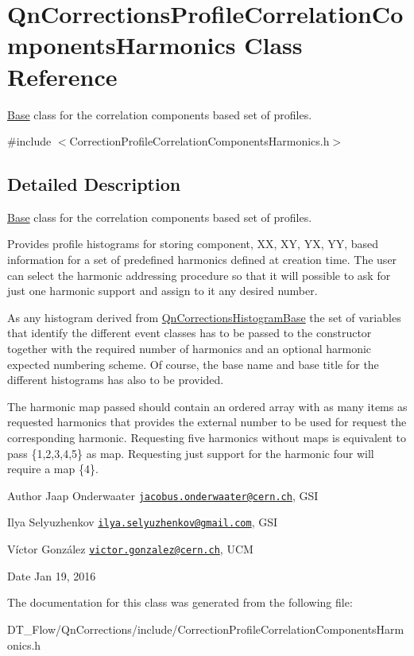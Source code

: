 \hypertarget{classQnCorrectionsProfileCorrelationComponentsHarmonics}{}\section{Qn\+Corrections\+Profile\+Correlation\+Components\+Harmonics Class Reference}
\label{classQnCorrectionsProfileCorrelationComponentsHarmonics}


\mbox{\hyperlink{classBase}{Base}} class for the correlation components based set of profiles.  




{\ttfamily \#include $<$Correction\+Profile\+Correlation\+Components\+Harmonics.\+h$>$}



\subsection{Detailed Description}
\mbox{\hyperlink{classBase}{Base}} class for the correlation components based set of profiles. 

Provides profile histograms for storing component, XX, XY, YX, YY, based information for a set of predefined harmonics defined at creation time. The user can select the harmonic addressing procedure so that it will possible to ask for just one harmonic support and assign to it any desired number.

As any histogram derived from \mbox{\hyperlink{classQnCorrectionsHistogramBase}{Qn\+Corrections\+Histogram\+Base}} the set of variables that identify the different event classes has to be passed to the constructor together with the required number of harmonics and an optional harmonic expected numbering scheme. Of course, the base name and base title for the different histograms has also to be provided.

The harmonic map passed should contain an ordered array with as many items as requested harmonics that provides the external number to be used for request the corresponding harmonic. Requesting five harmonics without maps is equivalent to pass \{1,2,3,4,5\} as map. Requesting just support for the harmonic four will require a map \{4\}.

\begin{DoxyAuthor}{Author}
Jaap Onderwaater \href{mailto:jacobus.onderwaater@cern.ch}{\tt jacobus.\+onderwaater@cern.\+ch}, G\+SI 

Ilya Selyuzhenkov \href{mailto:ilya.selyuzhenkov@gmail.com}{\tt ilya.\+selyuzhenkov@gmail.\+com}, G\+SI 

Víctor González \href{mailto:victor.gonzalez@cern.ch}{\tt victor.\+gonzalez@cern.\+ch}, U\+CM 
\end{DoxyAuthor}
\begin{DoxyDate}{Date}
Jan 19, 2016 
\end{DoxyDate}


The documentation for this class was generated from the following file\+:\begin{DoxyCompactItemize}
\item 
D\+T\+\_\+\+Flow/\+Qn\+Corrections/include/Correction\+Profile\+Correlation\+Components\+Harmonics.\+h\end{DoxyCompactItemize}
